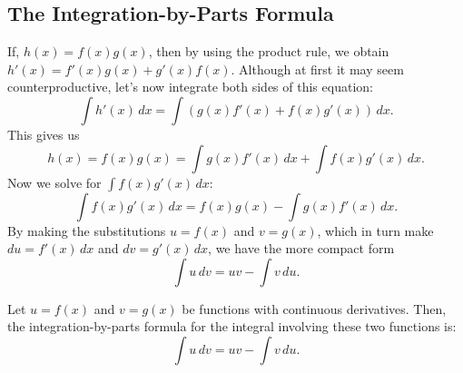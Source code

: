 \documentclass{report}
\begin{document}
    \bigbreak \noindent 
    \subsection*{The Integration-by-Parts Formula}
    \bigbreak \noindent 
    If, \( h(x) = f(x)g(x) \),
then by using the product rule, we obtain \( h'(x) = f'(x)g(x) + g'(x)f(x) \).
Although at first it may seem counterproductive, let’s now integrate both sides of this equation:
\[ \int h'(x) \, dx = \int \left( g(x)f'(x) + f(x)g'(x) \right) \, dx. \]
\bigbreak \noindent 
This gives us
\[ h(x) = f(x)g(x) = \int g(x)f'(x) \, dx + \int f(x)g'(x) \, dx. \]
Now we solve for \( \int f(x)g'(x) \, dx \):
\[ \int f(x)g'(x) \, dx = f(x)g(x) - \int g(x)f'(x) \, dx. \]
By making the substitutions \( u = f(x) \)
and \( v = g(x) \),
which in turn make \( du = f'(x) \, dx \)
and \( dv = g'(x) \, dx \),
we have the more compact form
\[ \int u \, dv = uv - \int v \, du. \]


    \pagebreak \bigbreak \noindent 
    \begin{thrm}
        Let \( u = f(x) \)  and \( v = g(x) \)  be functions with continuous derivatives. Then, the integration-by-parts formula for the integral involving these two functions is: \[ \int u \, dv = uv - \int v \, du. \]
    \end{thrm}
\end{document}
